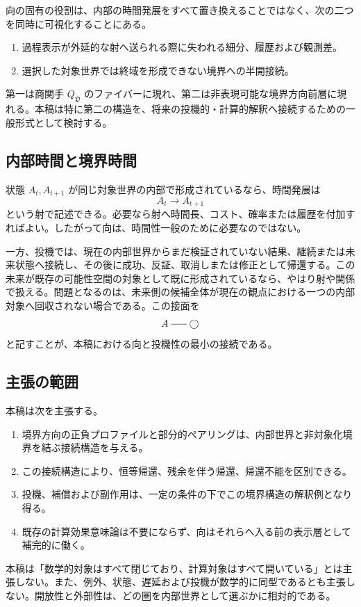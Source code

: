 \documentclass[a4paper,11pt]{ltjsarticle}
\theoremstyle{definition}
\theoremstyle{plain}
\newcommand{\dfix}{\bigcirc}
\newcommand{\dline}{\mathrel{\rule[0.55ex]{1.6em}{0.4pt}}}
\begin{document}
向の固有の役割は、内部の時間発展をすべて置き換えることではなく、次の二つを同時に可視化することにある。
\begin{enumerate}
 \item 過程表示が外延的な射へ送られる際に失われる細分、履歴および観測差。
 \item 選択した対象世界では終域を形成できない境界への半開接続。
\end{enumerate}

第一は商関手 $Q_{\mathfrak D}$ のファイバーに現れ、第二は非表現可能な境界方向前層に現れる。本稿は特に第二の構造を、将来の投機的・計算的解釈へ接続するための一般形式として検討する。

\subsection{内部時間と境界時間}

状態 $A_t,A_{t+1}$ が同じ対象世界の内部で形成されているなら、時間発展は
\[
 A_t\longrightarrow A_{t+1}
\]
という射で記述できる。必要なら射へ時間長、コスト、確率または履歴を付加すればよい。したがって向は、時間性一般のために必要なのではない。

一方、投機では、現在の内部世界からまだ検証されていない結果、継続または未来状態へ接続し、その後に成功、反証、取消しまたは修正として帰還する。この未来が既存の可能性空間の対象として既に形成されているなら、やはり射や関係で扱える。問題となるのは、未来側の候補全体が現在の観点における一つの内部対象へ回収されない場合である。この接面を
\[
 A\dline\dfix
\]
と記すことが、本稿における向と投機性の最小の接続である。

\subsection{主張の範囲}

本稿は次を主張する。
\begin{enumerate}
 \item 境界方向の正負プロファイルと部分的ペアリングは、内部世界と非対象化境界を結ぶ接続構造を与える。
 \item この接続構造により、恒等帰還、残余を伴う帰還、帰還不能を区別できる。
 \item 投機、補償および副作用は、一定の条件の下でこの境界構造の解釈例となり得る。
 \item 既存の計算効果意味論は不要にならず、向はそれらへ入る前の表示層として補完的に働く。
\end{enumerate}

本稿は「数学的対象はすべて閉じており、計算対象はすべて開いている」とは主張しない。また、例外、状態、遅延および投機が数学的に同型であるとも主張しない。開放性と外部性は、どの圏を内部世界として選ぶかに相対的である。
\end{document}
